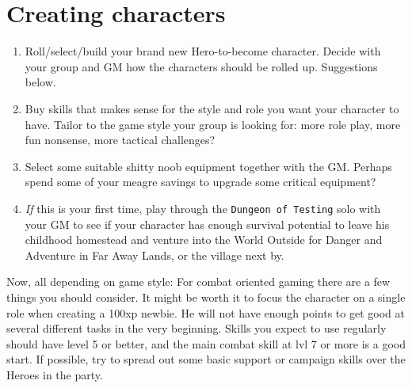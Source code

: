 
\section*{Creating characters}
\begin{enumerate}
\item Roll/select/build your brand new Hero-to-become character. Decide with your group and GM how the characters should be rolled up. Suggestions below.
\item Buy skills that makes sense for the style and role you want your character to have. Tailor to the game style your group is looking for: more role play, more fun nonsense, more tactical challenges?
\item Select some suitable shitty noob equipment together with the GM. Perhaps spend some of your meagre savings to upgrade some critical equipment?
\item \emph{If} this is your first time, play through the \texttt{Dungeon of Testing} solo with your GM to see if your character has enough survival potential to leave his childhood homestead and venture into the World Outside for Danger and Adventure in Far Away Lands, or the village next by.
\end{enumerate}

Now, all depending on game style: For combat oriented gaming there are a few things you should consider. It might be worth it to focus the character on a single role when creating a 100xp newbie. He will not have enough points to get good at several different tasks in the very beginning. Skills you expect to use regularly should have level 5 or better, and the main combat skill at lvl 7 or more is a good start. If possible, try to spread out some basic support or campaign skills over the Heroes in the party.

